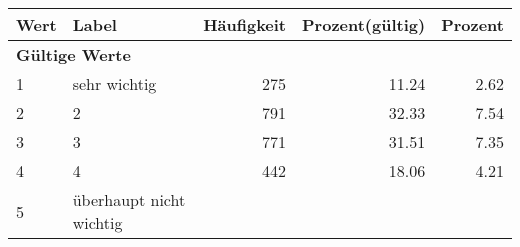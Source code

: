      \begin{longtable}{lXrrr}
     \toprule
     \textbf{Wert} & \textbf{Label} & \textbf{Häufigkeit} & \textbf{Prozent(gültig)} & \textbf{Prozent} \\
     \endhead
     \midrule
     \multicolumn{5}{l}{\textbf{Gültige Werte}}\\

     1 &
     \multicolumn{1}{X}{ sehr wichtig   } &


       \num{275} &
       \num[round-mode=places,round-precision=2]{11,24} &
         \num[round-mode=places,round-precision=2]{2,62} \\

     2 &
     \multicolumn{1}{X}{ 2   } &


       \num{791} &
       \num[round-mode=places,round-precision=2]{32,33} &
         \num[round-mode=places,round-precision=2]{7,54} \\

     3 &
     \multicolumn{1}{X}{ 3   } &


       \num{771} &
       \num[round-mode=places,round-precision=2]{31,51} &
         \num[round-mode=places,round-precision=2]{7,35} \\

     4 &
     \multicolumn{1}{X}{ 4   } &


       \num{442} &
       \num[round-mode=places,round-precision=2]{18,06} &
         \num[round-mode=places,round-precision=2]{4,21} \\

     5 &
     \multicolumn{1}{X}{ überhaupt nicht wichtig   } &



\end{longtable}

